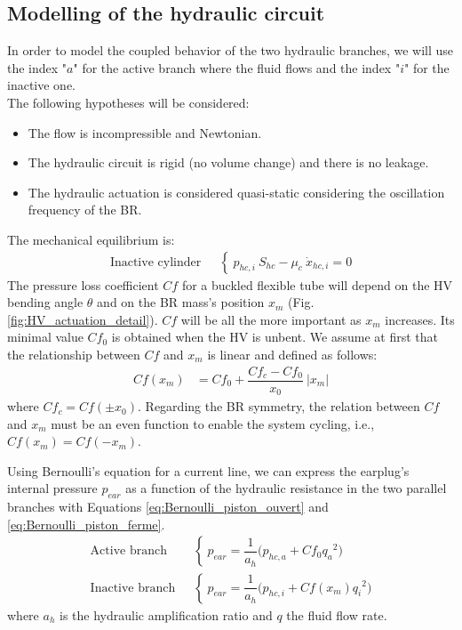 \documentclass[3p,twocolumn,preprint]{elsarticle}
\begin{document}
	\subsection{Modelling of the hydraulic circuit}	
	\label{subsec:The hydraulic circuit}
In order to model the coupled behavior of the two hydraulic branches, we will use the index "$a$" for the active branch where the fluid flows and the index "$i$" for the inactive one. \\
The following hypotheses will be considered:
\begin{itemize}
	\item The flow is incompressible and Newtonian.
	\item The hydraulic circuit is rigid (no volume change) and there is no leakage.
	\item The hydraulic actuation is considered quasi-static considering the oscillation frequency of the BR.
\end{itemize}
The mechanical equilibrium is:
\begin{align}
	\text{Inactive cylinder ~}& \left\{~
	p_{hc,i}\ S_{hc} - \mu_{c}\ \dot{x}_{hc,i} = 0
	\right.
	\label{eq:equilibre_dynamique_piston_ferme}
\end{align}
The pressure loss coefficient $Cf$ for a buckled flexible tube will depend on the HV bending angle $\theta$ and on the BR mass's position $x_m$ (Fig. \ref{fig:HV_actuation_detail}). $Cf$ will be all the more important as $x_m$ increases. Its minimal value $Cf_0$ is obtained when the HV is unbent. We assume at first that the relationship between $Cf$ and $x_m$ is linear and defined as follows:
\begin{align}
Cf(x_m) & = Cf_0 + \dfrac{Cf_c - Cf_0}{x_0}\ |x_m| 
\label{eq:Cf(x_m)_linear}
\end{align}
where $Cf_c=Cf(\pm x_0)$. Regarding the BR symmetry, the relation between $Cf$ and $x_m$ must be an even function to enable the system cycling, i.e., $Cf(x_m) = Cf(-x_m)$.

Using Bernoulli's equation for a current line, we can express the earplug's internal pressure $p_{ear}$ as a function of the hydraulic resistance in the two parallel branches with Equations \ref{eq:Bernoulli_piston_ouvert} and \ref{eq:Bernoulli_piston_ferme}.
\begin{align}
	\text{Active branch ~}& \left\{~
	p_{ear} = \dfrac{1}{a_h}\biggl(p_{hc,a} + Cf_0 {q_a}^2 \biggr)
	\right.
	\label{eq:Bernoulli_piston_ouvert}\\
	\text{Inactive branch ~}& \left\{~
	p_{ear} = \dfrac{1}{a_h}\biggl(p_{hc,i} + Cf(x_m) {q_i}^2 \biggr)
	\right.
	\label{eq:Bernoulli_piston_ferme}
\end{align}
where $a_h$ is the hydraulic amplification ratio and $q$ the fluid flow rate.
\end{document}
